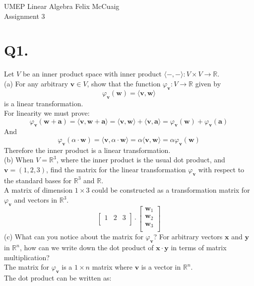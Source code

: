 \documentclass[12pt]{article}
\begin{document}
UMEP Linear Algebra \hfill Felix McCuaig \\
Assignment 3\\

\section*{Q1.} 
Let $V$ be an inner product space with inner product 
$\langle-,-\rangle : V \times V \rightarrow \mathbb{R}$.\\
\smallskip
(a) For any arbitrary $\mathbf{v} \in V$, show that the function $\varphi_\mathbf{v}: V \rightarrow \mathbb{R}$ given by\\
$$
\varphi_\mathbf{v}(\mathbf{w})= \langle \mathbf{v}, \mathbf{w} \rangle
$$
is a linear transformation.\\
\medskip
For linearity we must prove:\\

$$
\varphi_\mathbf{v}(\mathbf{w} + \mathbf{a})= 
\langle \mathbf{v}, \mathbf{w} + \mathbf{a} \rangle
= \langle \mathbf{v}, \mathbf{w}\rangle + 
\langle \mathbf{v}, \mathbf{a} \rangle
= \varphi_\mathbf{v}(\mathbf{w}) + \varphi_\mathbf{v}(\mathbf{a})
$$
And
$$
\varphi_\mathbf{v}(\alpha \cdot \mathbf{w})= 
\langle \mathbf{v}, \alpha \cdot \mathbf{w} \rangle
= \alpha \langle \mathbf{v}, \mathbf{w} \rangle
= \alpha \varphi_\mathbf{v}(\mathbf{w})
$$
Therefore the inner product is a linear transformation.\\
\smallskip
(b) When $V = \mathbb{R}^3$, where the inner product is the usual dot product, and $\mathbf{v}=(1,2,3)$, find the matrix for the linear transformation $\varphi_\mathbf{v}$ with respect to the standard bases for $\mathbb{R}^3$ and $\mathbb{R}$.\\
\medskip
A matrix of dimension $1 \times 3$ could be constructed as a transformation matrix for $\varphi_\mathbf{v}$ and vectors in $\mathbb{R}^3$.\\
$$
\begin{bmatrix}
	1 & 2 & 3 \\
\end{bmatrix}
\cdot
\begin{bmatrix}
	\mathbf{w}_1 \\
	\mathbf{w}_2 \\
	\mathbf{w}_3 \\
\end{bmatrix}
$$
(c) What can you notice about the matrix for $\varphi_\mathbf{v}$? For arbitrary vectors $\mathbf{x}$ and $\mathbf{y}$ in $\mathbb{R}^n$, how can we write down the dot product of $\mathbf{x} \cdot \mathbf{y}$ in terms of matrix multiplication?\\
\medskip
The matrix for $\varphi_\mathbf{v}$ is a $1\times n$ matrix where $\mathbf{v}$ is a vector in $\mathbb{R}^n$.\\
\medskip
The dot product can be written as:
\end{document}
